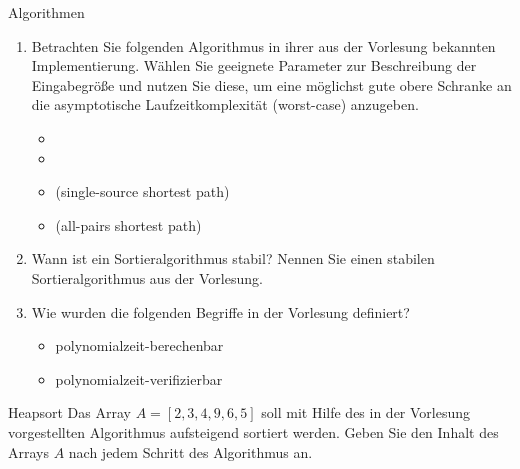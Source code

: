 \documentclass{article}
\begin{document}
\begin{exercise}{Algorithmen}
  \begin{enumerate}
    \item Betrachten Sie folgenden Algorithmus in ihrer aus der Vorlesung bekannten Implementierung. Wählen Sie geeignete Parameter zur Beschreibung der Eingabegröße und nutzen Sie diese, um eine möglichst gute obere Schranke an die asymptotische Laufzeitkomplexität (worst-case) anzugeben.
          \begin{itemize}
            \item {}
            \item {}
            \item {} (single-source shortest path)
            \item {} (all-pairs shortest path)
          \end{itemize}
    \item Wann ist ein Sortieralgorithmus stabil? Nennen Sie einen stabilen Sortieralgorithmus aus der Vorlesung.
    \item Wie wurden die folgenden Begriffe in der Vorlesung definiert?
          \begin{itemize}
            \item polynomialzeit-berechenbar
            \item polynomialzeit-verifizierbar
          \end{itemize}
  \end{enumerate}
\end{exercise}

\begin{exercise}{Heapsort}
  Das Array $A = [2,3,4,9,6,5]$ soll mit Hilfe des in der Vorlesung vorgestellten  Algorithmus aufsteigend sortiert werden. Geben Sie den Inhalt des Arrays $A$ nach jedem Schritt des Algorithmus an.
  
\end{exercise}
\end{document}
